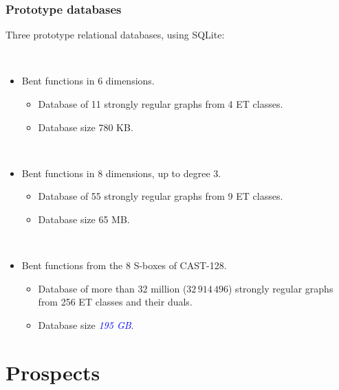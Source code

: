 \documentclass[pdf,sprung,slideColor,nocolorBG]{beamer}
\newenvironment{colortheme}[1]{
\def\ProvidesPackageRCS $##1${\relax}
\renewcommand{\ProcessOptions}{\relax}
\makeatletter

\makeatother
}{}
\newcommand{\Emph}[1]{\emph{\textcolor{blue}{#1}}}
\begin{document}
\begin{colortheme}{jubata}

\begin{frame}
\frametitle{Prototype databases}
Three prototype relational databases, using SQLite:

~

\begin{itemize}
 \item
Bent functions in 6 dimensions.
 \begin{itemize}
  \item
Database of 11 strongly regular graphs from 4 ET classes.
  \item
Database size 780 KB.
 \end{itemize}

~

 \item
Bent functions in 8 dimensions, up to degree 3.
 \begin{itemize}
  \item
Database of 55 strongly regular graphs from 9 ET classes.
  \item
Database size 65 MB.
 \end{itemize}

~

 \item
Bent functions from the 8 S-boxes of CAST-128.
 \begin{itemize}
  \item
Database of more than 32 million ($32\,914\,496$) strongly regular graphs from 256 ET classes and their duals.
  \item
Database size \Emph{195 GB}.
 \end{itemize}
\end{itemize}
\end{frame}

\end{colortheme}

\section{Prospects}
\end{document}
